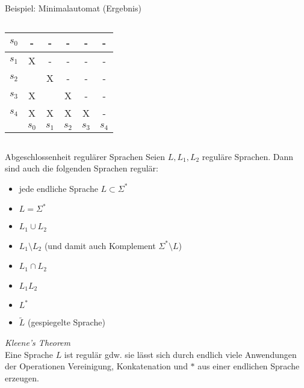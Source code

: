 \begin{frame}{Beispiel: Minimalautomat (Ergebnis)}
	\begin{columns}
		\centering
		\begin{tabular}{|r||c|c|c|c|c|}
			\hline
			$s_0$ & - & - & - & - & - \\
			\hline
			$s_1$ & X & - & - & - & - \\
			\hline
			$s_2$ &  & X & - & - & - \\
			\hline
			$s_3$ & X &  & X & - & - \\
			\hline
			$s_4$ & X & X & X & X & - \\
			\hline
			\hline
			& $s_0$ & $s_1$ & $s_2$ & $s_3$ & $s_4$ \\
			\hline
		\end{tabular}
		\centering
	\end{columns}
\end{frame}

\begin{frame}{Abgeschlossenheit regulärer Sprachen}
	Seien $L, L_1, L_2$ reguläre Sprachen. Dann sind auch die folgenden Sprachen regulär:
	\begin{itemize}
		\item jede endliche Sprache $L \subset \Sigma^*$
		\item $L = \Sigma^*$
		\item $L_1 \cup L_2$
		\item $L_1 \setminus L_2$ (und damit auch Komplement $\Sigma^* \setminus L$)
		\item $L_1 \cap L_2$
		\item $L_1L_2$
		\item $L^*$
		\item $\tilde{L}$ (gespiegelte Sprache)
	\end{itemize}
	\emph{Kleene's Theorem}\\
		Eine Sprache $L$ ist regulär gdw. sie lässt sich durch endlich viele
		Anwendungen der Operationen Vereinigung, Konkatenation und $*$ aus
		einer endlichen Sprache erzeugen.
\end{frame}

